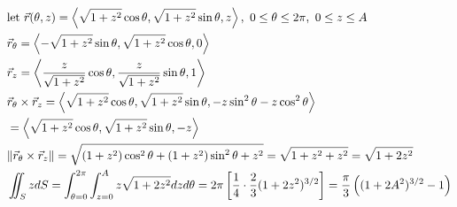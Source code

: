 \documentclass[11pt, fleqn]{article}
\begin{document}
\begin{align*}
    &\text{let }\vec{r}(\theta,z)=\brangle{\sqrt{1+z^2}\cos\theta,\sqrt{1+z^2}\sin\theta,z},\ 0\leq\theta\leq 2\pi,\ 0\leq z\leq A\\
    &\vec{r}_\theta=\brangle{-\sqrt{1+z^2}\sin\theta,\sqrt{1+z^2}\cos\theta,0}\\
    &\vec{r}_z=\brangle{\frac{z}{\sqrt{1+z^2}}\cos\theta,\frac{z}{\sqrt{1+z^2}}\sin\theta,1}\\
    &\vec{r}_\theta\times\vec{r}_z=\brangle{\sqrt{1+z^2}\cos\theta,\sqrt{1+z^2}\sin\theta,-z\sin^2\theta-z\cos^2\theta}\\
    &=\brangle{\sqrt{1+z^2}\cos\theta,\sqrt{1+z^2}\sin\theta,-z}\\
    &\|\vec{r}_\theta\times\vec{r}_z\|=\sqrt{(1+z^2)\cos^2\theta+(1+z^2)\sin^2\theta+z^2}=\sqrt{1+z^2+z^2}=\sqrt{1+2z^2}\\
    &\iint_S zdS=\int_{\theta=0}^{2\pi}\int_{z=0}^Az\sqrt{1+2z^2}dzd\theta=2\pi\brsquare{\frac{1}{4}\cdot\frac{2}{3}(1+2z^2)^{3/2}}=\frac{\pi}{3}\brround{(1+2A^2)^{3/2}-1}
\end{align*}
\end{document}

